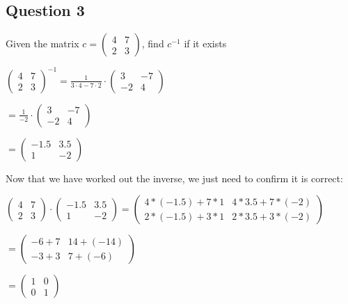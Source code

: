 \documentclass[options]{article}
\begin{document}
\subsection{Question 3}
Given the matrix \( c = \begin{pmatrix} 4 & 7\\2 & 3 \end{pmatrix} \), find \( c^{-1}\) if it exists
\begin{center}
    \( 
        \begin{pmatrix} 
            4 & 7\\2 & 3 
        \end{pmatrix}^{-1} 
        = \frac{1}{3 
            \cdot 4 - 7 
            \cdot 2} 
            \cdot 
        \begin{pmatrix}
            3 & -7\\-2 & 4
        \end{pmatrix}
    \)

    \(
        = 
        \frac{1}{-2}
        \cdot
        \begin{pmatrix}
            3 & -7\\
            -2 & 4
        \end{pmatrix}
    \)

    \(
        = 
        \begin{pmatrix}
            -1.5 & 3.5\\
            1 & -2
        \end{pmatrix}
    \)
\end{center}
Now that we have worked out the inverse, we just need to confirm it is correct:
\begin{center}
    \(
        \begin{pmatrix}
            4 & 7\\
            2 & 3
        \end{pmatrix}
        \cdot
        \begin{pmatrix}
            -1.5 & 3.5\\
            1 & -2
        \end{pmatrix}
        =
        \begin{pmatrix}
            4 * (-1.5) + 7 * 1 & 4 * 3.5 + 7 * (-2)\\
            2 * (-1.5) + 3 * 1 & 2 * 3.5 + 3 * (-2)
        \end{pmatrix}
    \)

    \(
        = 
        \begin{pmatrix}
            -6 + 7 & 14 + (-14)\\
            -3 + 3 & 7 + (-6)
        \end{pmatrix}
    \)

    \(
        =
        \begin{pmatrix}
            1 & 0\\
            0 & 1
        \end{pmatrix}
    \)
\end{center}
\end{document}
